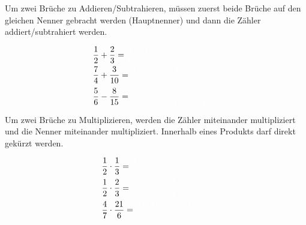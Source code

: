 \newpage
\begin{tcolorbox}
	Um zwei Brüche zu Addieren/Subtrahieren, müssen zuerst beide Brüche auf den gleichen Nenner gebracht werden (Hauptnenner) und dann die Zähler addiert/subtrahiert werden.
\end{tcolorbox}
\begin{bsp}
	\begin{align*}
		&\frac{1}{2}+\frac{2}{3}=\textcolor{loes}{\frac{3}{6}+\frac{4}{6}=\frac{3+4}{6}=\frac{7}{6}}\\
		&\frac{7}{4}+\frac{3}{10}=\textcolor{loes}{\frac{35}{20}+\frac{6}{20}=\frac{35+6}{20}=\frac{41}{20}}\\
		&\frac{5}{6}-\frac{8}{15}=\textcolor{loes}{\frac{25}{30}-\frac{16}{30}=\frac{\cancel{9}^3}{\cancel{10}^{10}}=\frac{3}{10}}
	\end{align*}
\end{bsp}

\begin{tcolorbox}
	Um zwei Brüche zu Multiplizieren, werden die Zähler miteinander multipliziert und die Nenner miteinander multipliziert. Innerhalb eines Produkts darf direkt gekürzt werden.
\end{tcolorbox}
\begin{bsp}
	\begin{align*}
		&\frac{1}{2}\cdot\frac{1}{3}=\textcolor{loes}{\frac{1\cdot 1}{2\cdot 3}=\frac{1}{6}}\\
		&\frac{1}{2}\cdot\frac{2}{3}=\textcolor{loes}{\frac{1\cdot 2}{2\cdot 3}=\frac{1\cdot \cancel{2}}{\cancel{2}\cdot 3}=\frac{1}{3}}\\
		&\frac{4}{7}\cdot\frac{21}{6}=\textcolor{loes}{\frac{\cancel{4}^2\cdot \cancel{21}^3}{\cancel{7}^1\cdot \cancel{6}^3}=\frac{2\cdot\cancel{3}^1}{1\cdot\cancel{3}^1}=2}
	\end{align*}
\end{bsp}


